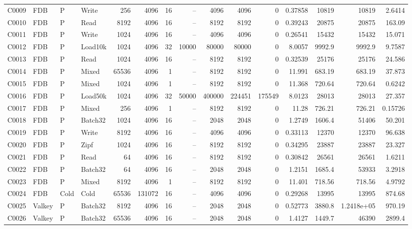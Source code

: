 \begin{landscape}
\begin{longtable}{llllrrrrrrrrrrr}
C0009 & FDB & P & Write & 256 & 4096 & 16 & -- & 4096 & 4096 & 0 & 0.37858 & 10819 & 10819 & 2.6414\\
C0010 & FDB & P & Read & 8192 & 4096 & 16 & -- & 8192 & 8192 & 0 & 0.39243 & 20875 & 20875 & 163.09\\
C0011 & FDB & P & Write & 1024 & 4096 & 16 & -- & 4096 & 4096 & 0 & 0.26541 & 15432 & 15432 & 15.071\\
C0012 & FDB & P & Load10k & 1024 & 4096 & 32 & 10000 & 80000 & 80000 & 0 & 8.0057 & 9992.9 & 9992.9 & 9.7587\\
C0013 & FDB & P & Read & 1024 & 4096 & 16 & -- & 8192 & 8192 & 0 & 0.32539 & 25176 & 25176 & 24.586\\
C0014 & FDB & P & Mixed & 65536 & 4096 & 1 & -- & 8192 & 8192 & 0 & 11.991 & 683.19 & 683.19 & 37.873\\
C0015 & FDB & P & Mixed & 1024 & 4096 & 1 & -- & 8192 & 8192 & 0 & 11.368 & 720.64 & 720.64 & 0.6242\\
C0016 & FDB & P & Load50k & 1024 & 4096 & 32 & 50000 & 400000 & 224451 & 175549 & 8.0123 & 28013 & 28013 & 27.357\\
C0017 & FDB & P & Mixed & 256 & 4096 & 1 & -- & 8192 & 8192 & 0 & 11.28 & 726.21 & 726.21 & 0.15726\\
C0018 & FDB & P & Batch32 & 1024 & 4096 & 16 & -- & 2048 & 2048 & 0 & 1.2749 & 1606.4 & 51406 & 50.201\\
C0019 & FDB & P & Write & 8192 & 4096 & 16 & -- & 4096 & 4096 & 0 & 0.33113 & 12370 & 12370 & 96.638\\
C0020 & FDB & P & Zipf & 1024 & 4096 & 16 & -- & 8192 & 8192 & 0 & 0.34295 & 23887 & 23887 & 23.327\\
C0021 & FDB & P & Read & 64 & 4096 & 16 & -- & 8192 & 8192 & 0 & 0.30842 & 26561 & 26561 & 1.6211\\
C0022 & FDB & P & Batch32 & 64 & 4096 & 16 & -- & 2048 & 2048 & 0 & 1.2151 & 1685.4 & 53933 & 3.2918\\
C0023 & FDB & P & Mixed & 8192 & 4096 & 1 & -- & 8192 & 8192 & 0 & 11.401 & 718.56 & 718.56 & 4.9792\\
C0024 & FDB & Cold & Cold & 65536 & 131072 & 16 & -- & 4096 & 4096 & 0 & 0.29268 & 13995 & 13995 & 874.68\\
C0025 & Valkey & P & Batch32 & 8192 & 4096 & 16 & -- & 2048 & 2048 & 0 & 0.52773 & 3880.8 & 1.2418e+05 & 970.19\\
C0026 & Valkey & P & Batch32 & 65536 & 4096 & 16 & -- & 2048 & 2048 & 0 & 1.4127 & 1449.7 & 46390 & 2899.4\\

\end{longtable}
\end{landscape}
